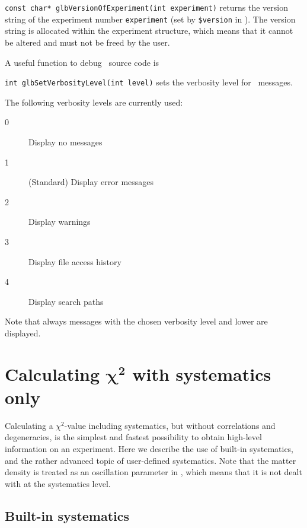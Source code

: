 \begin{function}
{\tt const char* glbVersionOfExperiment(int experiment)} returns
the version string of the experiment number {\tt experiment} (set by
{\tt \$version} in \AEDL ).
The version string is allocated within the experiment structure, which means
that it cannot be altered and must not be freed by the
user.
\end{function}
%
A useful function to debug \GLOBES\ source code is 
\begin{function}
{\tt int glbSetVerbosityLevel(int level)} sets the verbosity level
for \GLOBES\ messages.
\end{function}
The following verbosity levels are currently used:
\begin{description}
\item[0] Display no messages
\item[1] (Standard) Display error messages
\item[2] Display warnings
\item[3] Display file access history
\item[4] Display search paths
\end{description}
Note that always messages with the chosen verbosity level and lower
are displayed.

\chapter[Calculating $\chi^2$ with systematics only]{Calculating $\boldsymbol{\chi^2}$ with systematics only}

Calculating a $\chi^2$-value including systematics, but without correlations and degeneracies, is the simplest and fastest possibility to obtain high-level information on an experiment. Here we describe the use of built-in
systematics, and the rather advanced topic of user-defined systematics. Note that the matter density 
is treated as an oscillation parameter in \GLOBES , which means that it is not dealt with at the
systematics level.

\section{Built-in systematics}

